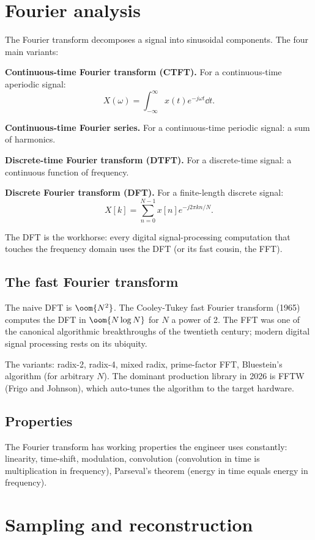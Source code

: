 \section{Fourier analysis}

The Fourier transform decomposes a signal into sinusoidal components. The four main variants:

\textbf{Continuous-time Fourier transform (CTFT).} For a continuous-time aperiodic signal:
\[
X(\omega) = \int_{-\infty}^{\infty} x(t) e^{-j\omega t} \dd t.
\]

\textbf{Continuous-time Fourier series.} For a continuous-time periodic signal: a sum of harmonics.

\textbf{Discrete-time Fourier transform (DTFT).} For a discrete-time signal: a continuous function of frequency.

\textbf{Discrete Fourier transform (DFT).} For a finite-length discrete signal:
\[
X[k] = \sum_{n=0}^{N-1} x[n] e^{-j 2\pi k n / N}.
\]

The DFT is the workhorse: every digital signal-processing computation that touches the frequency domain uses the DFT (or its fast cousin, the FFT).

\subsection{The fast Fourier transform}

The naive DFT is $\oom{N^2}$. The Cooley-Tukey fast Fourier transform (1965) computes the DFT in $\oom{N \log N}$ for $N$ a power of 2. The FFT was one of the canonical algorithmic breakthroughs of the twentieth century; modern digital signal processing rests on its ubiquity.

The variants: radix-2, radix-4, mixed radix, prime-factor FFT, Bluestein's algorithm (for arbitrary $N$). The dominant production library in 2026 is FFTW (Frigo and Johnson), which auto-tunes the algorithm to the target hardware.

\subsection{Properties}

The Fourier transform has working properties the engineer uses constantly: linearity, time-shift, modulation, convolution (convolution in time is multiplication in frequency), Parseval's theorem (energy in time equals energy in frequency).

\section{Sampling and reconstruction}

